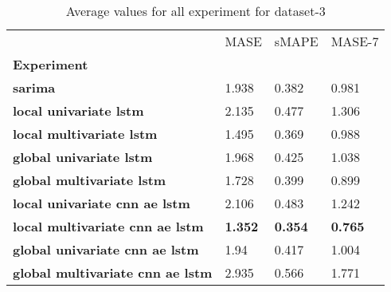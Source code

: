 \begin{table}[h]
\centering
\caption{Average values for all experiment for dataset-3}
\label{table:Average-metric-dataset-3}
\begin{tabular}{llll}
\toprule
{} &            MASE &           sMAPE &          MASE-7 \\
\textbf{Experiment                     } &                 &                 &                 \\
\midrule
\textbf{sarima                         } &           1.938 &           0.382 &           0.981 \\
\textbf{local univariate lstm          } &           2.135 &           0.477 &           1.306 \\
\textbf{local multivariate lstm        } &           1.495 &           0.369 &           0.988 \\
\textbf{global univariate lstm         } &           1.968 &           0.425 &           1.038 \\
\textbf{global multivariate lstm       } &           1.728 &           0.399 &           0.899 \\
\textbf{local univariate cnn ae lstm   } &           2.106 &           0.483 &           1.242 \\
\textbf{local multivariate cnn ae lstm } &  \textbf{1.352} &  \textbf{0.354} &  \textbf{0.765} \\
\textbf{global univariate cnn ae lstm  } &            1.94 &           0.417 &           1.004 \\
\textbf{global multivariate cnn ae lstm} &           2.935 &           0.566 &           1.771 \\
\bottomrule
\end{tabular}
\end{table}

